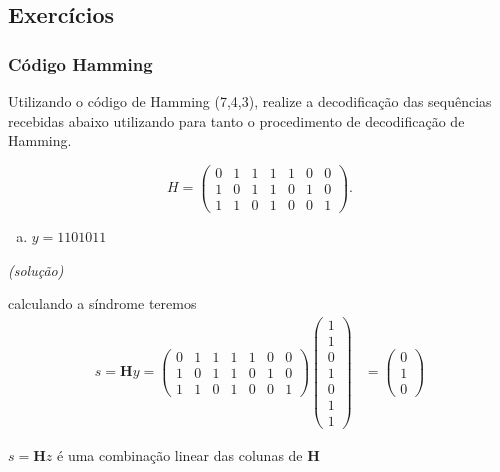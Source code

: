\subsection{Exercícios}
\begin{frame}[allowframebreaks]
  \frametitle{Código Hamming}
  \begin{exercise}
  Utilizando o código de Hamming (7,4,3), realize a decodificação das sequências recebidas abaixo
  utilizando para tanto o procedimento de decodificação de Hamming.

        \begin{equation}
        H = 
        \begin{pmatrix}
        0 & 1 & 1 & 1 & 1 & 0 & 0 \\
        1 & 0 & 1 & 1 & 0 & 1 & 0 \\
        1 & 1 & 0 & 1 & 0 & 0 & 1 
        \end{pmatrix}.
        \end{equation}


  \exercisebreak

  \begin{enumerate}[a)]
  \item $y = 1101011$
  \end{enumerate}
  \textit{(solução)}

  calculando a síndrome teremos
    \begin{align}
    s = \mathbf{H} y =  
	\begin{pmatrix}
        0 & 1 & 1 & 1 & 1 & 0 & 0 \\
        1 & 0 & 1 & 1 & 0 & 1 & 0 \\
        1 & 1 & 0 & 1 & 0 & 0 & 1 
        \end{pmatrix} 
	\begin{pmatrix} 1\\ 1\\ 0\\ 1\\ 0\\ 1\\ 1 \end{pmatrix} &= 
	\begin{pmatrix} 0 \\ 1\\ 0\end{pmatrix} 
    \end{align}

    \exercisebreak

    $s = \mathbf{H} z$ é uma combinação linear das colunas de $\mathbf{H}$


\end{exercise}
\end{frame}
